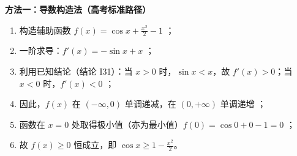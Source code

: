 \begin{proofbox}
\textbf{方法一：导数构造法（高考标准路径）}
\begin{enumerate}
    \item 构造辅助函数 $f(x) = \cos x + \frac{x^2}{2} - 1$ ；
    \item 一阶求导：$f'(x) = -\sin x + x$ ；
    \item 利用已知结论（结论 I31）：当 $x > 0$ 时，$\sin x < x$，故 $f'(x) > 0$；当 $x < 0$ 时，$f'(x) < 0$ ；
    \item 因此，$f(x)$ 在 $(-\infty, 0)$ 单调递减，在 $(0, +\infty)$ 单调递增 ；
    \item 函数在 $x=0$ 处取得极小值（亦为最小值）$f(0) = \cos 0 + 0 - 1 = 0$ ；
    \item 故 $f(x) \geqslant 0$ 恒成立，即 $\cos x \geqslant 1 - \frac{x^2}{2}$。
\end{enumerate}
\end{proofbox}